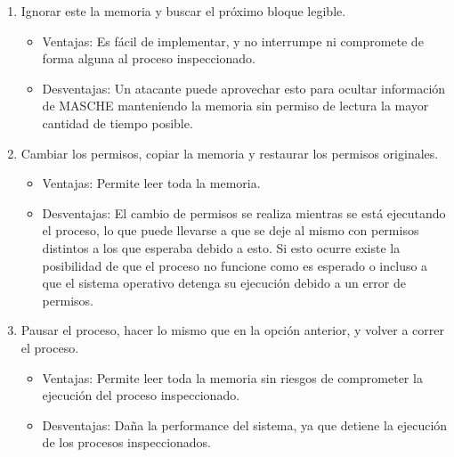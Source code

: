 \begin{enumerate}

\item Ignorar este la memoria y buscar el próximo bloque legible.

\begin{itemize}

\item Ventajas: Es fácil de implementar, y no interrumpe ni compromete de forma
alguna al proceso inspeccionado.

\item Desventajas: Un atacante puede aprovechar esto para ocultar información
de MASCHE manteniendo la memoria sin permiso de lectura la mayor cantidad de
tiempo posible.

\end{itemize}

\item Cambiar los permisos, copiar la memoria y restaurar los permisos
originales.

\begin{itemize}

\item Ventajas: Permite leer toda la memoria.

\item Desventajas: El cambio de permisos se realiza mientras se está ejecutando
el proceso, lo que puede llevarse a que se deje al mismo con permisos distintos
a los que esperaba debido a esto. Si esto ocurre existe la posibilidad de que
el proceso no funcione como es esperado o incluso a que el sistema operativo
detenga su ejecución debido a un error de permisos.

\end{itemize}

\item Pausar el proceso, hacer lo mismo que en la opción anterior, y volver a
correr el proceso.

\begin{itemize}

\item Ventajas: Permite leer toda la memoria sin riesgos de comprometer la
ejecución del proceso inspeccionado.

\item Desventajas: Daña la performance del sistema, ya que detiene la ejecución
de los procesos inspeccionados.

\end{itemize}

\end{enumerate}

